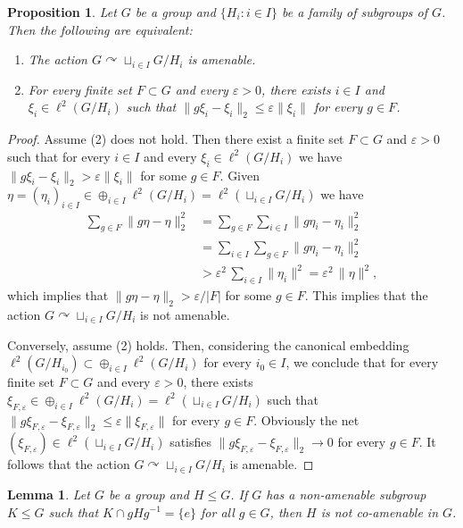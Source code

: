 \documentclass[11pt]{amsart}
\newtheorem{prop}[thm]{Proposition}
\newtheorem{lem}[thm]{Lemma}
\theoremstyle{definition}
\newcommand{\eps}{\varepsilon}
\newcommand{\act}{\curvearrowright}
\begin{document}
\begin{prop}
Let $G$ be a group and $\{H_i :i\in I\}$ be a family of subgroups of $G$. Then the following are equivalent:
\begin{enumerate}
\item
The action $G\act \sqcup_{i\in I} G/H_i$ is amenable.
\item
For every finite set $F\subset G$ and every $\eps>0$, there exists $i\in I$ and $\xi_i\in \ell^2(G/H_i)$ such that $\|g\xi_i-\xi_i\|_2\le \eps\|\xi_i\|$ for every $g\in F$.
\end{enumerate}
\end{prop}

\begin{proof}
Assume (2) does not hold. Then there exist a finite set $F\subset G$ and $\eps>0$ such that for every $i\in I$ and every $\xi_i\in \ell^2(G/H_i)$ we have $\|g\xi_i-\xi_i\|_2 > \eps\|\xi_i\|$ for some $g\in F$.
Given $\eta= (\eta_i)_{i\in I}\in \oplus_{i\in I} \ell^2(G/H_i) =  \ell^2(\sqcup_{i\in I} G/H_i)$ we have
\[\begin{split}
\sum_{g\in F}\|g\eta-\eta\|_2^2 &= \sum_{g\in F}\sum_{i\in I}\|g\eta_i-\eta_i\|_2^2 \\&= \sum_{i\in I}\sum_{g\in F}\|g\eta_i-\eta_i\|_2^2 \\&> \eps^2\,\sum_{i\in I}\|\eta_i\|^2 = \eps^2\,\|\eta\|^2 ,
\end{split}
\]
which implies that $\|g\eta-\eta\|_2 > \eps/|F|$ for some $g\in F$. This implies that the action $G\act \sqcup_{i\in I} G/H_i$ is not amenable.

Conversely, assume (2) holds. Then, considering the canonical embedding $\ell^2(G/H_{i_0}) \subset\oplus_{i\in I} \ell^2(G/H_i)$ for every $i_0\in I$, we conclude that for every finite set $F\subset G$ and every $\eps>0$, there exists $\xi_{F,\eps}\in \oplus_{i\in I} \ell^2(G/H_i) =  \ell^2(\sqcup_{i\in I} G/H_i)$ such that $\|g\xi_{F,\eps}-\xi_{F,\eps}\|_2\le \eps\|\xi_{F,\eps}\|$ for every $g\in F$. Obviously the net $(\xi_{F,\eps})\in \ell^2(\sqcup_{i\in I} G/H_i)$ satisfies $\|g\xi_{F,\eps}-\xi_{F,\eps}\|_2\to 0$ for every $g\in F$. It follows that the action $G\act \sqcup_{i\in I} G/H_i$ is amenable.
\end{proof}


\begin{lem}
Let $G$ be a group and $H\le G$. If $G$ has a non-amenable subgroup $K\le G$ such that $K\cap gHg^{-1} = \{e\}$ for all $g\in G$, then $H$ is not co-amenable in $G$.
\end{lem}
\end{document}
